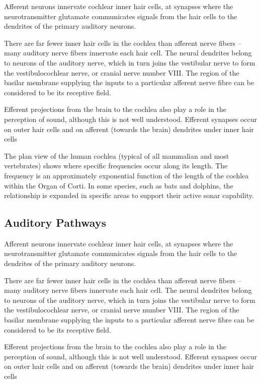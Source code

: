 Afferent neurons innervate cochlear inner hair cells, at synapses where the neurotransmitter glutamate communicates signals from the hair cells to the dendrites of the primary auditory neurons.

There are far fewer inner hair cells in the cochlea than afferent nerve fibers -- many auditory nerve fibers innervate each hair cell. The neural dendrites belong to neurons of the auditory nerve, which in turn joins the vestibular nerve to form the vestibulocochlear nerve, or cranial nerve number VIII. The region of the basilar membrane supplying the inputs to a particular afferent nerve fibre can be considered to be its receptive field.

Efferent projections from the brain to the cochlea also play a role in the perception of sound, although this is not well understood. Efferent synapses occur on outer hair cells and on afferent (towards the brain) dendrites under inner hair cells

The plan view of the human cochlea (typical of all mammalian and most vertebrates) shows where specific frequencies occur along its length. The frequency is an approximately exponential function of the length of the cochlea within the Organ of Corti. In some species, such as bats and dolphins, the relationship is expanded in specific areas to support their active sonar capability.

\hypertarget{auditory-pathways}{%
\subsection{Auditory Pathways}\label{auditory-pathways}}

Afferent neurons innervate cochlear inner hair cells, at synapses where the neurotransmitter glutamate communicates signals from the hair cells to the dendrites of the primary auditory neurons.

There are far fewer inner hair cells in the cochlea than afferent nerve fibers -- many auditory nerve fibers innervate each hair cell. The neural dendrites belong to neurons of the auditory nerve, which in turn joins the vestibular nerve to form the vestibulocochlear nerve, or cranial nerve number VIII. The region of the basilar membrane supplying the inputs to a particular afferent nerve fibre can be considered to be its receptive field.

Efferent projections from the brain to the cochlea also play a role in the perception of sound, although this is not well understood. Efferent synapses occur on outer hair cells and on afferent (towards the brain) dendrites under inner hair cells

